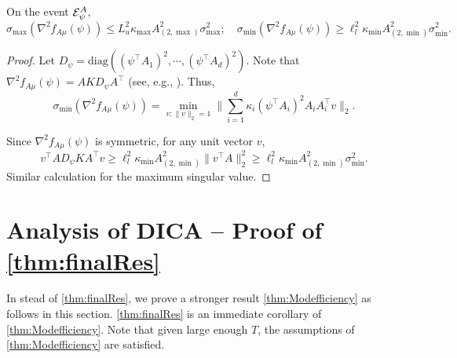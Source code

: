 \begin{lemma}
	\label{lem:boundsigmaminnabla}
	On the event $\mathcal{E}^A_{\psi}$, 
	$$\sigma_{\max}(\nabla^2f_{A\mu}(\psi)) \le L_u^2 \kappa_{\max}A^2_{(2,\max)}\sigma_{\max}^2; \quad \sigma_{\min}(\nabla^2f_{A\mu}(\psi)) \ge \ell_l^2\kappa_{\min}A^2_{(2,\min)}\sigma_{\min}^2.$$
\end{lemma}
\begin{proof}
	Let $D_{\psi} = \text{diag}\left((\psi^{\top}A_1)^2,\cdots, (\psi^{\top}A_d)^2\right)$.
	Note that $\nabla^2f_{A\mu}(\psi)  = AKD_{\psi}A^{\top}$ (see, e.g., \citealt{hsu2013learning}). 
	Thus, 
	\[\sigma_{\min}(\nabla^2f_{A\mu}(\psi)) = \min_{v:\|v\|_2=1}\|\sum_{i=1}^{d} \kappa_i(\psi^{\top}A_i)^2A_iA_i^{\top}v\|_2.
	\] 
	
	Since $\nabla^2f_{A\mu}(\psi)$ is symmetric, 
	for any unit vector $v$, 
	\[v^{\top}AD_{\psi}KA^{\top}v \ge \ell_l^2\kappa_{\min} A^2_{(2,\min)}\|v^{\top}A\|_2^2 \ge \ell_l^2\kappa_{\min}A^2_{(2,\min)}\sigma_{\min}^2.
	\]
	Similar calculation for the maximum singular value.
\end{proof}

\section{Analysis of DICA -- Proof of \cref{thm:finalRes}}
\label{subsec:ProofModEff}
In stead of \cref{thm:finalRes}, we prove a stronger result \cref{thm:Modefficiency} as follows in this section. 
\cref{thm:finalRes} is an immediate corollary of \cref{thm:Modefficiency}.
Note that given large enough $T$, the assumptions of \cref{thm:Modefficiency} are satisfied.

